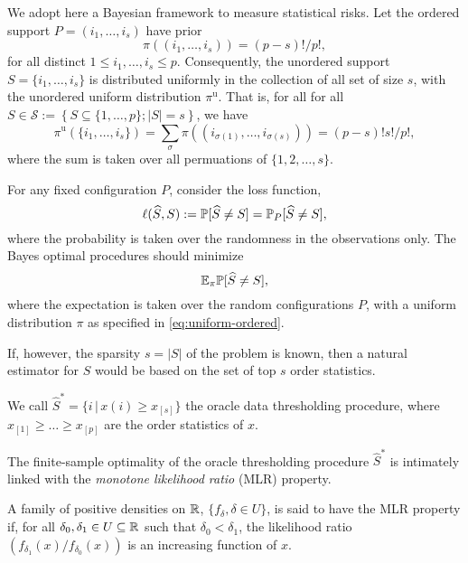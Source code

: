 We adopt here a Bayesian framework to measure statistical risks. 
Let the ordered support $P=(i_1,\ldots,i_s)$ have prior
\begin{equation} \label{eq:uniform-ordered}
\pi((i_1,\ldots, i_s)) = {(p-s)!}/{p!},
\end{equation}
for all distinct $1\le i_1, \ldots, i_s\le p$.
Consequently, the unordered support $S=\{i_1,\ldots,i_s\}$ is distributed uniformly in the collection of all set of size $s$, with the unordered uniform distribution $\pi^{\text{u}}$. That is, for all for all $S\in\mathcal{S}:=\left\{S\subseteq\{1,\ldots,p\};|S|=s\right\}$, we have 
\begin{equation} \label{eq:uniform}
\pi^{\text{u}}
(\{i_1,\ldots, i_s\}) = \sum_{\sigma}\pi((i_{\sigma(1)},\ldots, i_{\sigma(s)})) = {(p-s)!s!}/{p!},
\end{equation}
where the sum is taken over all permuations of $\{1,2,\ldots,s\}$.

For any fixed configuration $P$, consider the loss function,
$$
\ell(\widehat{S},S) := \P[\widehat{S} \neq S] = \P_{P}[\widehat{S} \neq S],
$$
where the probability is taken over the randomness in the observations only.
The Bayes optimal procedures should minimize 
\begin{equation} \label{eq:Bayes-risk}
    \E_\pi \P[\widehat{S} \neq S],
\end{equation}
where the expectation is taken over the random configurations $P$, with a uniform distribution $\pi$ as specified in \eqref{eq:uniform-ordered}.


If, however, the sparsity $s = |S|$ of the problem is known, then a natural estimator for $S$ would be based on the set of top $s$ order statistics.
\begin{definition}
We call $\widehat{S}^* = \{i\,|\, x(i)\ge x_{[s]}\}$ the oracle data thresholding procedure, where $x_{[1]} \ge \ldots \ge x_{[p]}$ are the order statistics of $x$.
\end{definition}

The finite-sample optimality of the oracle thresholding procedure $\widehat{S}^*$ is intimately linked with the \emph{monotone likelihood ratio} (MLR) property.
\begin{definition}
A family of positive densities on $\R$, $\{f_\delta, \delta \in U\}$, is said to have the MLR property if, for all $\delta_0, \delta_1\in U\subseteq\R$ such that $\delta_0 < \delta_1$, the likelihood ratio $\left(f_{\delta_1}(x)/f_{\delta_0}(x)\right)$ is an increasing function of $x$.
\end{definition}


